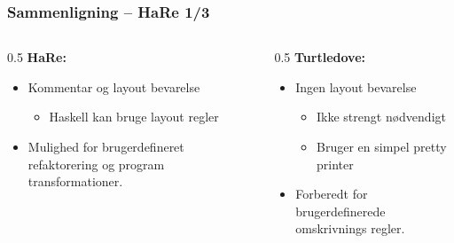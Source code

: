\documentclass[slidestop,compress,mathserif, xcolor=dvipsnames]{beamer}
\begin{document}
\begin{frame}[c]
  \frametitle{Sammenligning -- HaRe 1/3}  

  \begin{columns}    
    \begin{column}{0.5\textwidth{}}
      \textbf{HaRe:}
      \begin{itemize}
      \item Kommentar og layout bevarelse 
        \begin{itemize}
        \item Haskell kan bruge layout regler
        \end{itemize}    
      \item Mulighed for brugerdefineret refaktorering og program transformationer.      
      \end{itemize}      
    \end{column}
    \begin{column}{0.5\textwidth{}}
      \textbf{Turtledove:}
      \begin{itemize}
      \item Ingen layout bevarelse 
        \begin{itemize}
        \item Ikke strengt nødvendigt
        \item Bruger en simpel pretty printer
        \end{itemize}
      \item Forberedt for brugerdefinerede omskrivnings regler.
      \end{itemize}
    \end{column}
  \end{columns}
\end{frame}
\end{document}
